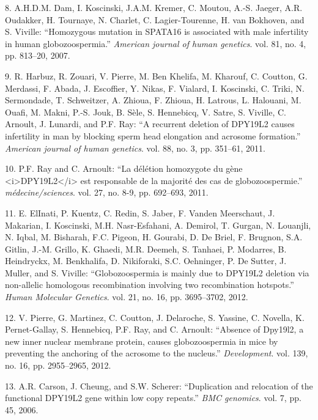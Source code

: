 \documentclass[12pt,twoside]{reedthesis}
\theoremstyle{definition}
\theoremstyle{definition}
\theoremstyle{remark}
\begin{document}
  \hypertarget{ref-Dam2007}{}
  8. A.H.D.M. Dam, I. Koscinski, J.A.M. Kremer, C. Moutou, A.-S. Jaeger,
  A.R. Oudakker, H. Tournaye, N. Charlet, C. Lagier-Tourenne, H. van
  Bokhoven, and S. Viville: ``Homozygous mutation in SPATA16 is associated
  with male infertility in human globozoospermia.'' \emph{American journal
  of human genetics}. vol. 81, no. 4, pp. 813--20, 2007.
  
  \hypertarget{ref-Harbuz2011}{}
  9. R. Harbuz, R. Zouari, V. Pierre, M. Ben Khelifa, M. Kharouf, C.
  Coutton, G. Merdassi, F. Abada, J. Escoffier, Y. Nikas, F. Vialard, I.
  Koscinski, C. Triki, N. Sermondade, T. Schweitzer, A. Zhioua, F. Zhioua,
  H. Latrous, L. Halouani, M. Ouafi, M. Makni, P.-S. Jouk, B. Sèle, S.
  Hennebicq, V. Satre, S. Viville, C. Arnoult, J. Lunardi, and P.F. Ray:
  ``A recurrent deletion of DPY19L2 causes infertility in man by blocking
  sperm head elongation and acrosome formation.'' \emph{American journal
  of human genetics}. vol. 88, no. 3, pp. 351--61, 2011.
  
  \hypertarget{ref-Ray2011}{}
  10. P.F. Ray and C. Arnoult: ``La délétion homozygote du gène
  \textless{}i\textgreater{}DPY19L2\textless{}/i\textgreater{} est
  responsable de la majorité des cas de globozoospermie.''
  \emph{médecine/sciences}. vol. 27, no. 8-9, pp. 692--693, 2011.
  
  \hypertarget{ref-ElInati2012}{}
  11. E. ElInati, P. Kuentz, C. Redin, S. Jaber, F. Vanden Meerschaut, J.
  Makarian, I. Koscinski, M.H. Nasr-Esfahani, A. Demirol, T. Gurgan, N.
  Louanjli, N. Iqbal, M. Bisharah, F.C. Pigeon, H. Gourabi, D. De Briel,
  F. Brugnon, S.A. Gitlin, J.-M. Grillo, K. Ghaedi, M.R. Deemeh, S.
  Tanhaei, P. Modarres, B. Heindryckx, M. Benkhalifa, D. Nikiforaki, S.C.
  Oehninger, P. De Sutter, J. Muller, and S. Viville: ``Globozoospermia is
  mainly due to DPY19L2 deletion via non-allelic homologous recombination
  involving two recombination hotspots.'' \emph{Human Molecular Genetics}.
  vol. 21, no. 16, pp. 3695--3702, 2012.
  
  \hypertarget{ref-Pierre2012}{}
  12. V. Pierre, G. Martinez, C. Coutton, J. Delaroche, S. Yassine, C.
  Novella, K. Pernet-Gallay, S. Hennebicq, P.F. Ray, and C. Arnoult:
  ``Absence of Dpy19l2, a new inner nuclear membrane protein, causes
  globozoospermia in mice by preventing the anchoring of the acrosome to
  the nucleus.'' \emph{Development}. vol. 139, no. 16, pp. 2955--2965,
  2012.
  
  \hypertarget{ref-Carson2006}{}
  13. A.R. Carson, J. Cheung, and S.W. Scherer: ``Duplication and
  relocation of the functional DPY19L2 gene within low copy repeats.''
  \emph{BMC genomics}. vol. 7, pp. 45, 2006.
  
\end{document}
